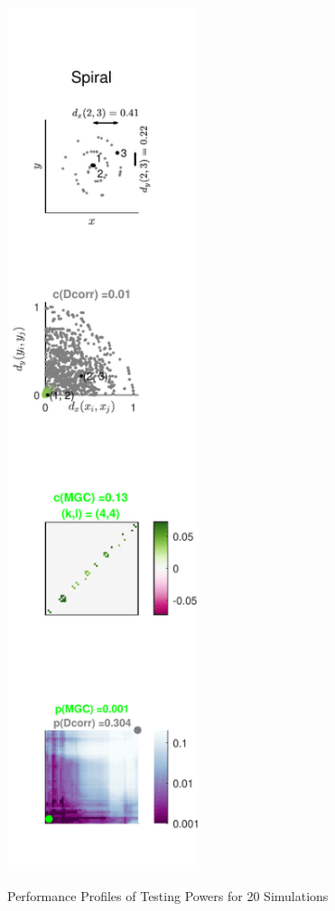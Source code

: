 \documentclass[11pt]{article}
\begin{document}
\begin{figure}[htbp]
{\includegraphics[width=0.5\textwidth]{../Figures/Fig8}
}
\caption{Performance Profiles of Testing Powers for 20 Simulations}
\label{figSim3}
\end{figure}
\end{document}
